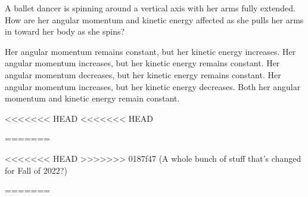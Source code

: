 \documentclass{../../oss-apphys-exam}
\begin{document}
\begin{multicols*}{2}
\begin{questions}
    \question A ballet dancer is spinning around a vertical axis with her arms
    fully extended. How are her angular momentum and kinetic energy affected
    as she pulls her arms in toward her body as she spins?
    \begin{choices}
      \choice Her angular momentum remains constant, but her kinetic energy
      increases.
      \choice Her angular momentum increases, but her kinetic energy remains
      constant.
      \choice Her angular momentum decreases, but her kinetic energy remains
      constant.
      \choice Her angular momentum increases, but her kinetic energy decreases.
      \choice Both her angular momentum and kinetic energy remain constant.
    \end{choices}
<<<<<<< HEAD
<<<<<<< HEAD

=======
    \vspace{.7in}
    
<<<<<<< HEAD
>>>>>>> 0187f47 (A whole bunch of stuff that's changed for Fall of 2022?)
    
=======
    \vspace{.7in}
    

\end{questions}
\end{multicols*}
\end{document}
